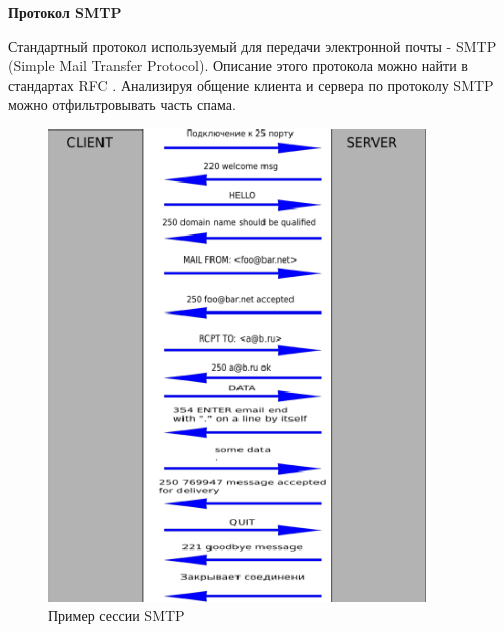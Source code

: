 \textbf{Протокол SMTP}

Стандартный протокол используемый для передачи электронной почты - SMTP (Simple Mail Transfer Protocol). Описание этого протокола можно найти в стандартах RFC \cite{RFC2081}. Анализируя общение клиента и сервера по протоколу SMTP можно отфильтровывать часть спама.


\begin{figure}[h]
\begin{center}
\includegraphics[width=10cm]{img/smtp_session}
\end{center}
\caption{Пример сессии SMTP}
\label{smtp_session}
\end{figure}

